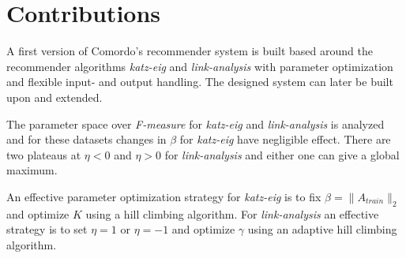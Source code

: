 
\section{Contributions}\label{sec:intro:contributions}

A first version of Comordo's recommender system is built based around the recommender algorithms \textit{katz-eig} and \textit{link-analysis} with parameter optimization and flexible input- and output handling. The designed system can later be built upon and extended.

The parameter space over \textit{F-measure} for \textit{katz-eig} and \textit{link-analysis} is analyzed and for these datasets changes in $\beta$ for \textit{katz-eig}  have negligible effect. There are two plateaus at $\eta < 0$ and $\eta > 0$ for \textit{link-analysis} and either one can give a global maximum.

An effective parameter optimization strategy for \textit{katz-eig} is to fix $\beta = \| A_{train} \|_2$ and optimize $K$ using a hill climbing algorithm. For \textit{link-analysis} an effective strategy is to set $\eta = 1$ or $\eta = -1$ and optimize $\gamma$ using an adaptive hill climbing algorithm.

